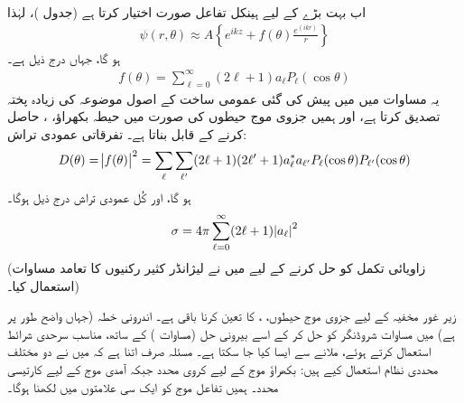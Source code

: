 اب بہت بڑے  کے لیے ہینکل تفاعل  صورت اختیار کرتا ہے (جدول )، لہٰذا
\begin{align}
	\psi(r, \theta)\approx A\left\{e^{ikz}+f(\theta)\frac{e^{(ikr)}}{r}\right\}
\end{align}
ہو گا، جہاں  درج ذیل ہے۔
\begin{align}\label{مساوات_بکھراو_بکھراو_حیطہ}
	f(\theta) = \sum_{\ell=0}^{\infty}(2\ell +1)a_{\ell}P_{\ell}(\cos\theta)
\end{align}
یہ مساوات  میں میں پیش کی گئی عمومی ساخت کے اصول موضوعہ کی زیادہ پختہ تصدیق کرتا ہے، اور ہمیں جزوی موج حیطوں  کی صورت میں حیطہ بکھراؤ، ، حاصل کرنے کے قابل بناتا ہے۔ تفرقاتی عمودی تراش:
\begin{align}
	D(\theta) = \abs{f(\theta)}^2 = \sum_{\ell}\sum_{\ell'}(2\ell+1)(2\ell'+1)a^*_{\ell}a_{\ell'}P_{\ell}(\cos\theta)P_{\ell'}(\cos\theta)
\end{align}
ہو گا، اور کُل عمودی تراش درج ذیل ہوگا۔
\begin{align}\label{مساوات_بکھراو_کل_عمودی_تراش}
	\sigma=4\pi\sum_{\ell=0}^{\infty}(2\ell+1)\abs{a_{\ell}}^2
\end{align}
(زاویائی تکمل کو حل کرنے کے لیے میں نے لیژانڈر کثیر رکنیوں کا تعامد مساوات  استعمال کیا۔)


زیر غور مخفیہ کے لیے جزوی موج حیطوں، ، کا تعین کرنا باقی ہے۔ اندرونی خطہ (جہاں  واضح طور پر  ہے) میں مساوات شروڈنگر کو حل کر کے اسے بیرونی حل (مساوات ) کے ساتھ، مناسب سرحدی شرائط استعمال کرتے ہوئے، ملانے سے ایسا کیا جا سکتا ہے۔ مسئلہ صرف اتنا ہے کہ میں نے دو مختلف محددی نظام استعمال کیے ہیں: بکھراؤ موج کے لیے کروی محدد جبکہ آمدی موج کے لیے کارتیسی محدد۔ ہمیں تفاعل موج کو ایک سی علامتوں میں لکھنا ہوگا۔

